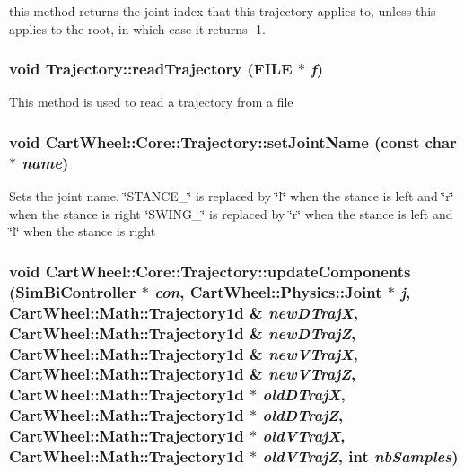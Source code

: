 \label{classCartWheel_1_1Core_1_1Trajectory_a76eaf0a8f08de66c1524b4d515c34c7a}
this method returns the joint index that this trajectory applies to, unless this applies to the root, in which case it returns -\/1. \hypertarget{classCartWheel_1_1Core_1_1Trajectory_ae3f274a31efed5387bd138d7014a776c}{
\subsubsection[{readTrajectory}]{\setlength{\rightskip}{0pt plus 5cm}void Trajectory::readTrajectory (FILE $\ast$ {\em f})}}
\label{classCartWheel_1_1Core_1_1Trajectory_ae3f274a31efed5387bd138d7014a776c}
This method is used to read a trajectory from a file \hypertarget{classCartWheel_1_1Core_1_1Trajectory_afe7f573f2fd012d473bd87e7781bd1ef}{
\subsubsection[{setJointName}]{\setlength{\rightskip}{0pt plus 5cm}void CartWheel::Core::Trajectory::setJointName (const char $\ast$ {\em name})}}
\label{classCartWheel_1_1Core_1_1Trajectory_afe7f573f2fd012d473bd87e7781bd1ef}
Sets the joint name. \char`\"{}STANCE\_\-\char`\"{} is replaced by \char`\"{}l\char`\"{} when the stance is left and \char`\"{}r\char`\"{} when the stance is right \char`\"{}SWING\_\-\char`\"{} is replaced by \char`\"{}r\char`\"{} when the stance is left and \char`\"{}l\char`\"{} when the stance is right \hypertarget{classCartWheel_1_1Core_1_1Trajectory_a7b1baee227c431fca148ef37fa5f2b6e}{
\subsubsection[{updateComponents}]{\setlength{\rightskip}{0pt plus 5cm}void CartWheel::Core::Trajectory::updateComponents ({\bf SimBiController} $\ast$ {\em con}, \/  {\bf CartWheel::Physics::Joint} $\ast$ {\em j}, \/  {\bf CartWheel::Math::Trajectory1d} \& {\em newDTrajX}, \/  {\bf CartWheel::Math::Trajectory1d} \& {\em newDTrajZ}, \/  {\bf CartWheel::Math::Trajectory1d} \& {\em newVTrajX}, \/  {\bf CartWheel::Math::Trajectory1d} \& {\em newVTrajZ}, \/  {\bf CartWheel::Math::Trajectory1d} $\ast$ {\em oldDTrajX}, \/  {\bf CartWheel::Math::Trajectory1d} $\ast$ {\em oldDTrajZ}, \/  {\bf CartWheel::Math::Trajectory1d} $\ast$ {\em oldVTrajX}, \/  {\bf CartWheel::Math::Trajectory1d} $\ast$ {\em oldVTrajZ}, \/  int {\em nbSamples})}}
